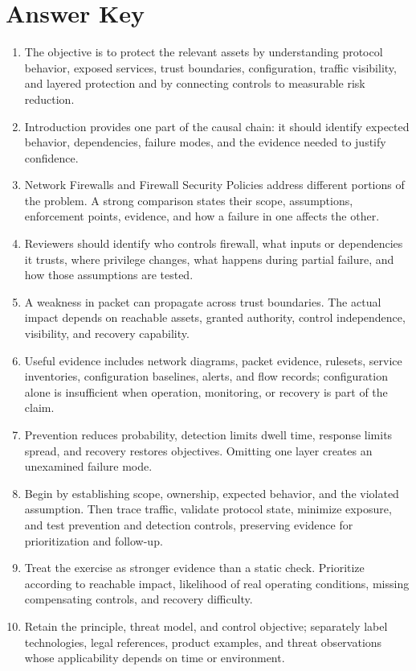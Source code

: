 \documentclass[11pt,letterpaper]{article}
\begin{document}
\section*{Answer Key}
\begin{enumerate}
\item The objective is to protect the relevant assets by understanding protocol behavior, exposed services, trust boundaries, configuration, traffic visibility, and layered protection and by connecting controls to measurable risk reduction.
\item Introduction provides one part of the causal chain: it should identify expected behavior, dependencies, failure modes, and the evidence needed to justify confidence.
\item Network Firewalls and Firewall Security Policies address different portions of the problem. A strong comparison states their scope, assumptions, enforcement points, evidence, and how a failure in one affects the other.
\item Reviewers should identify who controls firewall, what inputs or dependencies it trusts, where privilege changes, what happens during partial failure, and how those assumptions are tested.
\item A weakness in packet can propagate across trust boundaries. The actual impact depends on reachable assets, granted authority, control independence, visibility, and recovery capability.
\item Useful evidence includes network diagrams, packet evidence, rulesets, service inventories, configuration baselines, alerts, and flow records; configuration alone is insufficient when operation, monitoring, or recovery is part of the claim.
\item Prevention reduces probability, detection limits dwell time, response limits spread, and recovery restores objectives. Omitting one layer creates an unexamined failure mode.
\item Begin by establishing scope, ownership, expected behavior, and the violated assumption. Then trace traffic, validate protocol state, minimize exposure, and test prevention and detection controls, preserving evidence for prioritization and follow-up.
\item Treat the exercise as stronger evidence than a static check. Prioritize according to reachable impact, likelihood of real operating conditions, missing compensating controls, and recovery difficulty.
\item Retain the principle, threat model, and control objective; separately label technologies, legal references, product examples, and threat observations whose applicability depends on time or environment.
\end{enumerate}
\end{document}
